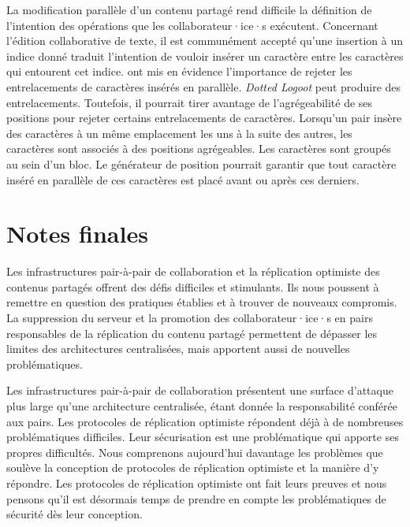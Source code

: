La modification parallèle d'un contenu partagé rend difficile la définition de l'intention des opérations que les collaborateur·ice·s exécutent.
Concernant l'édition collaborative de texte, il est communément accepté qu'une insertion à un indice donné traduit l'intention de vouloir insérer un caractère entre les caractères qui entourent cet indice.
\textcite{kleppmann2019_interleaving} ont mis en évidence l'importance de rejeter les entrelacements de caractères insérés en parallèle.
\emph{Dotted Logoot} peut produire des entrelacements.
Toutefois, il pourrait tirer avantage de l'agrégeabilité de ses positions pour rejeter certains entrelacements de caractères.
Lorsqu'un pair insère des caractères à un même emplacement les uns à la suite des autres, les caractères sont associés à des positions agrégeables.
Les caractères sont groupés au sein d'un bloc.
Le générateur de position pourrait garantir que tout caractère inséré en parallèle de ces caractères est placé avant ou après ces derniers.


\section{Notes finales}

Les infrastructures pair-à-pair de collaboration et la réplication optimiste des contenus partagés offrent des défis difficiles et stimulants.
Ils nous poussent à remettre en question des pratiques établies et à trouver de nouveaux compromis.
La suppression du serveur et la promotion des collaborateur·ice·s en pairs responsables de la réplication du contenu partagé permettent de dépasser les limites des architectures centralisées, mais apportent aussi de nouvelles problématiques.

Les infrastructures pair-à-pair de collaboration présentent une surface d'attaque plus large qu'une architecture centralisée, étant donnée la responsabilité conférée aux pairs.
Les protocoles de réplication optimiste répondent déjà à de nombreuses problématiques difficiles.
Leur sécurisation est une problématique qui apporte ses propres difficultés.
Nous comprenons aujourd'hui davantage les problèmes que soulève la conception de protocoles de réplication optimiste et la manière d'y répondre.
Les protocoles de réplication optimiste ont fait leurs preuves et nous pensons qu'il est désormais temps de prendre en compte les problématiques de sécurité dès leur conception.

